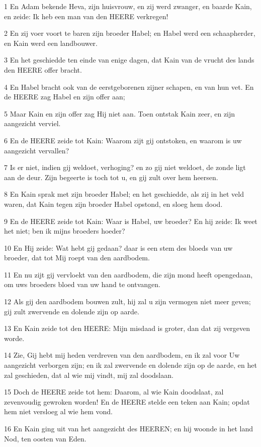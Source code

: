\par 1 En Adam bekende Heva, zijn huisvrouw, en zij werd zwanger, en baarde Kain, en zeide: Ik heb een man van den HEERE verkregen!
\par 2 En zij voer voort te baren zijn broeder Habel; en Habel werd een schaapherder, en Kain werd een landbouwer.
\par 3 En het geschiedde ten einde van enige dagen, dat Kain van de vrucht des lands den HEERE offer bracht.
\par 4 En Habel bracht ook van de eerstgeborenen zijner schapen, en van hun vet. En de HEERE zag Habel en zijn offer aan;
\par 5 Maar Kain en zijn offer zag Hij niet aan. Toen ontstak Kain zeer, en zijn aangezicht verviel.
\par 6 En de HEERE zeide tot Kain: Waarom zijt gij ontstoken, en waarom is uw aangezicht vervallen?
\par 7 Is er niet, indien gij weldoet, verhoging? en zo gij niet weldoet, de zonde ligt aan de deur. Zijn begeerte is toch tot u, en gij zult over hem heersen.
\par 8 En Kain sprak met zijn broeder Habel; en het geschiedde, als zij in het veld waren, dat Kain tegen zijn broeder Habel opstond, en sloeg hem dood.
\par 9 En de HEERE zeide tot Kain: Waar is Habel, uw broeder? En hij zeide: Ik weet het niet; ben ik mijns broeders hoeder?
\par 10 En Hij zeide: Wat hebt gij gedaan? daar is een stem des bloeds van uw broeder, dat tot Mij roept van den aardbodem.
\par 11 En nu zijt gij vervloekt van den aardbodem, die zijn mond heeft opengedaan, om uws broeders bloed van uw hand te ontvangen.
\par 12 Als gij den aardbodem bouwen zult, hij zal u zijn vermogen niet meer geven; gij zult zwervende en dolende zijn op aarde.
\par 13 En Kain zeide tot den HEERE: Mijn misdaad is groter, dan dat zij vergeven worde.
\par 14 Zie, Gij hebt mij heden verdreven van den aardbodem, en ik zal voor Uw aangezicht verborgen zijn; en ik zal zwervende en dolende zijn op de aarde, en het zal geschieden, dat al wie mij vindt, mij zal doodslaan.
\par 15 Doch de HEERE zeide tot hem: Daarom, al wie Kain doodslaat, zal zevenvoudig gewroken worden! En de HEERE stelde een teken aan Kain; opdat hem niet versloeg al wie hem vond.
\par 16 En Kain ging uit van het aangezicht des HEEREN; en hij woonde in het land Nod, ten oosten van Eden.
